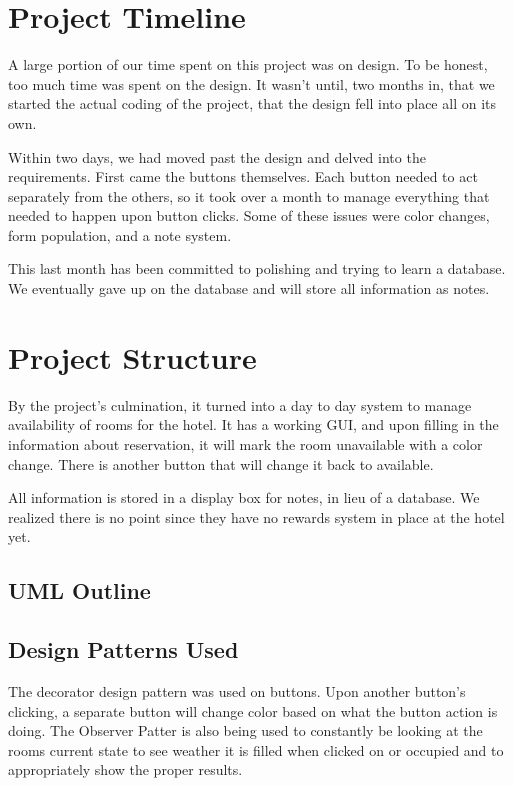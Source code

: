 \documentclass[10pt,conference,onecolumn,compsoc]{IEEEtran}
\begin{document}
\section{Project Timeline}
A large portion of our time spent on this project was on design. To be honest, too much time was spent on the design. It wasn't until, two months in, that we started the actual coding of the project, that the design fell into place all on its own. 

Within two days, we had moved past the design and delved into the requirements. First came the buttons themselves. Each button needed to act separately from the others, so it took over a month to manage everything that needed to happen upon button clicks. Some of these issues were color changes, form population, and a note system.

This last month has been committed to polishing and trying to learn a database. We eventually gave up on the database and will store all information as notes.

\section{Project Structure}
By the project's culmination, it turned into a day to day system to manage availability of rooms for the hotel. It has a working GUI, and upon filling in the information about reservation, it will mark the room unavailable with a color change. There is another button that will change it back to available. 

All information is stored in a display box for notes, in lieu of a database. We realized there is no point since they have no rewards system in place at the hotel yet. 

\subsection{UML Outline}





\subsection{Design Patterns Used}
The decorator design pattern was used on buttons. Upon another button's clicking, a separate button will change color based on what the button action is doing.
The Observer Patter is also being used to constantly be looking at the rooms current state to see weather it is filled when clicked on or occupied and to appropriately show the proper results.
\end{document}
